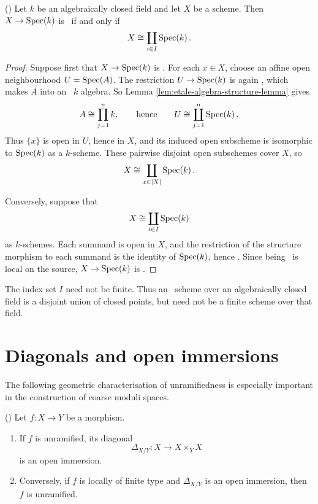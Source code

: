 \begin{lemma}
	\label{lem:etale-over-field}
	(\cite[][Tag 02GL]{stacks-project})
	Let $k$ be an algebraically closed field and let $X$ be a scheme.
	Then $X\to\operatorname{Spec}\!\left(k\right)$ is \etale\ if and only if
	\[
	X\cong\coprod_{i\in I}\operatorname{Spec}\!\left(k\right).
	\]
\end{lemma}

\begin{proof}
	Suppose first that $X\to\operatorname{Spec}\!\left(k\right)$ is \etale.
	For each $x\in X$, choose an affine open
	neighbourhood $U=\operatorname{Spec}\!\left(A\right)$.
	The restriction $U\to\operatorname{Spec}\!\left(k\right)$ is again \etale, which makes $A$ into an \etale\ $k$ algebra.
	So Lemma \ref{lem:etale-algebra-structure-lemma} gives
	\[
	A\cong\prod_{j = 1}^{n} k,
	\qquad\text{hence}\qquad
	U\cong\coprod_{j = 1}^{n} \operatorname{Spec}\!\left(k\right).
	\]
	Thus $\{x\}$ is open in $U$, hence in $X$,
	and its induced open subscheme is isomorphic
	to $\operatorname{Spec}\!\left(k\right)$ as a $k$-scheme.
	These pairwise disjoint open subschemes cover $X$,
	so
	\[
	X\cong\coprod_{x\in |X|}\operatorname{Spec}\!\left(k\right).
	\]
	
	Conversely, suppose that
	\[
	X\cong\coprod_{i\in I}\operatorname{Spec}\!\left(k\right)
	\]
	as $k$-schemes.
	Each summand is open in $X$, and the restriction
	of the structure morphism to each summand is
	the identity of $\operatorname{Spec}\!\left(k\right)$, hence \etale.
	Since being \etale\ is local on the source,
	$X\to\operatorname{Spec}\!\left(k\right)$ is \etale.
\end{proof}

\begin{remark}
	The index set $I$ need not be finite.
	Thus an \etale\ scheme over an algebraically closed field is a disjoint
	union of closed points, but need not be a finite scheme over that field.
\end{remark}

\section{Diagonals and open immersions}


The following geometric characterisation of unramifiedness
is especially important in the construction of coarse
moduli spaces.

\begin{lemma}
	\label{lem:unramified-diagonal}
	(\cite[][Tag 02GE]{stacks-project})
	Let $f:X\to Y$ be a morphism.
	\begin{enumerate}
		\item If $f$ is unramified, its diagonal
		\[
		\Delta_{X/Y}:X\longrightarrow X\times_Y X
		\]
		is an open immersion.
		\item Conversely, if $f$ is locally of finite
		type and $\Delta_{X/Y}$ is an open immersion,
		then $f$ is unramified.
	\end{enumerate}
\end{lemma}

